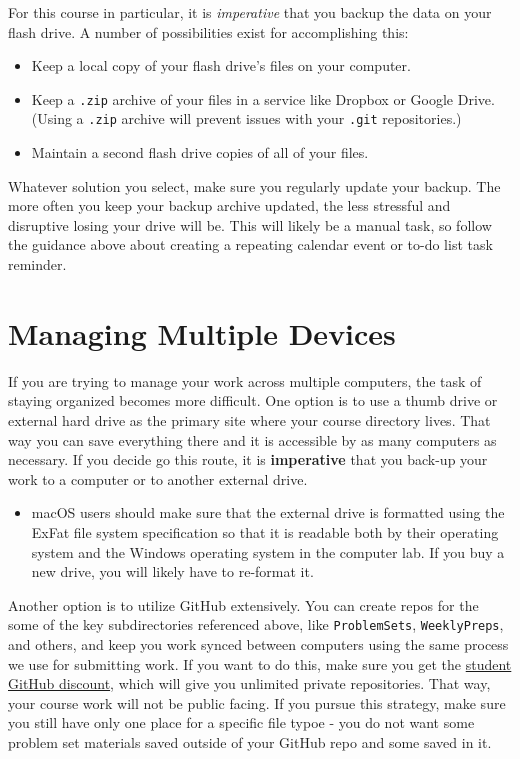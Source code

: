 \documentclass[]{book}
\providecommand{\tightlist}{%
  \setlength{\itemsep}{0pt}\setlength{\parskip}{0pt}}
\newenvironment{rmdblock}[1]
  {\begin{shaded*}
  \begin{itemize}
  \renewcommand{\labelitemi}{
    \raisebox{-.7\height}[0pt][0pt]{
      {\setkeys{Gin}{width=3em,keepaspectratio}\texttt{[image: images/\#1]}}
    }
  }
  \item
  }
  {
  \end{itemize}
  \end{shaded*}
  }
\newenvironment{rmdtip}
  {\begin{rmdblock}{tip}}
  {\end{rmdblock}}
\theoremstyle{definition}
\theoremstyle{definition}
\theoremstyle{definition}
\theoremstyle{remark}
\begin{document}
For this course in particular, it is \emph{imperative} that you backup
the data on your flash drive. A number of possibilities exist for
accomplishing this:

\begin{itemize}
\tightlist
\item
  Keep a local copy of your flash drive's files on your computer.
\item
  Keep a \texttt{.zip} archive of your files in a service like Dropbox
  or Google Drive. (Using a \texttt{.zip} archive will prevent issues
  with your \texttt{.git} repositories.)
\item
  Maintain a second flash drive copies of all of your files.
\end{itemize}

Whatever solution you select, make sure you regularly update your
backup. The more often you keep your backup archive updated, the less
stressful and disruptive losing your drive will be. This will likely be
a manual task, so follow the guidance above about creating a repeating
calendar event or to-do list task reminder.

\section{Managing Multiple Devices}\label{managing-multiple-devices}

If you are trying to manage your work across multiple computers, the
task of staying organized becomes more difficult. One option is to use a
thumb drive or external hard drive as the primary site where your course
directory lives. That way you can save everything there and it is
accessible by as many computers as necessary. If you decide go this
route, it is \textbf{imperative} that you back-up your work to a
computer or to another external drive.

\begin{rmdtip}
macOS users should make sure that the external drive is formatted using
the ExFat file system specification so that it is readable both by their
operating system and the Windows operating system in the computer lab.
If you buy a new drive, you will likely have to re-format it.
\end{rmdtip}

Another option is to utilize GitHub extensively. You can create repos
for the some of the key subdirectories referenced above, like
\texttt{ProblemSets}, \texttt{WeeklyPreps}, and others, and keep you
work synced between computers using the same process we use for
submitting work. If you want to do this, make sure you get the
\href{https://education.github.com/discount_requests/new}{student GitHub
discount}, which will give you unlimited private repositories. That way,
your course work will not be public facing. If you pursue this strategy,
make sure you still have only one place for a specific file typoe - you
do not want some problem set materials saved outside of your GitHub repo
and some saved in it.
\end{document}
